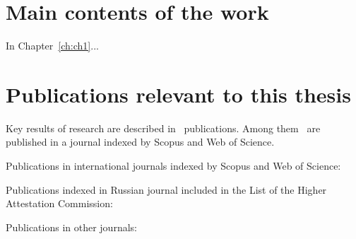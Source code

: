 \newpage
\section*{Main contents of the work}

In Chapter~\ref{ch:ch1}...

\section*{Publications relevant to this thesis}
Key results of research are described in \theAllMyPapers~publications. Among them \theScopusPapers~are published in a journal indexed by Scopus and Web of Science. 

Publications in international journals indexed by Scopus and Web of Science:
\printPapperScopus

Publications indexed in Russian journal included in the List of the Higher Attestation Commission: 

Publications in other journals:
\printPapperOther
